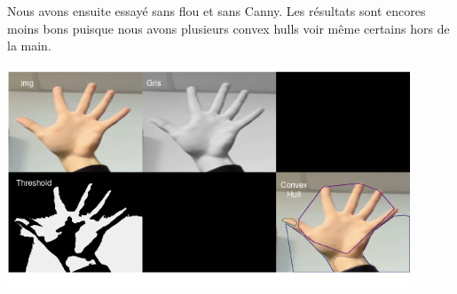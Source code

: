 \documentclass[11pt]{article}
\begin{document}
Nous avons ensuite essayé sans flou et sans Canny. Les résultats sont encores moins bons puisque nous avons plusieurs convex hulls voir même certains hors de la main.
\begin{center}
    \includegraphics[width=0.9\textwidth]{images/pre_ttt_3.png}
\end{center}
\bigbreak
\end{document}
